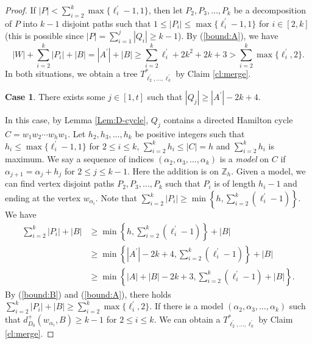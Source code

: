 \documentclass[11pt,a4paper]{article}
\theoremstyle{definition}
\newtheorem{case}{Case}
\begin{document}
\begin{proof}
If $|P|<\sum_{i=2}^k \max\{\ell^\prime_i-1,1\}$, then let $P_2,P_3,\ldots,P_k$ be a decomposition of $P$ into $k-1$ disjoint paths such that $1\leq |P_i|\leq \max\{\ell^\prime_i-1,1\}$ for $i\in [2,k]$ (this is possible since $|P|=\sum_{i=1}^j |Q_i|\geq k-1$).
By (\ref{bound:A}), we have
$$|W|+\sum_{i=2}^k|P_i|+|B|=|A^\prime|+|B|\geq \sum_{i=2}^k \ell^\prime_i+2k^2+2k+3>\sum_{i=2}^k \max\{\ell^\prime_i,2\}.$$
In both situations, we obtain a tree $T^*_{ \ell^\prime_2, \ldots, \ell^\prime_k}$ by Claim \ref{cl:merge}.


\begin{case}
There exists some $j\in[1,t]$ such that $|Q_j|\geq |A^\prime|-2k+4$.
\end{case}
In this case, by Lemma \ref{Lem:D-cycle}, $Q_j$ contains a directed Hamilton cycle $C=w_1w_2\cdots w_hw_1$.
Let $h_2,h_3,\ldots,h_k$ be positive integers such that $h_i\leq \max\{\ell^\prime_i-1,1\}$ for $2\leq i\leq k$, $\sum_{i=2}^k h_i\leq |C|=h$  and $\sum_{i=2}^k h_i$ is maximum.
We say a sequence of indices $(\alpha_2,\alpha_3,\ldots,\alpha_k)$ is a {\it model} on $C$ if $\alpha_{j+1}=\alpha_{j}+h_{j}$ for $2\leq j\leq k-1$. Here the addition is on $\mathbb{Z}_h$. Given a model, we can find vertex disjoint paths $P_2,P_3,\ldots,P_k$ such that $P_i$ is of length $h_i-1$ and ending at the vertex $w_{\alpha_i}$.
Note that $\sum_{i=2}^k|P_i|\geq \min\left\{h, \sum_{i=2}^k(\ell^\prime_i-1)\right\}$. We have
\begin{align*}
\sum_{i=2}^k|P_i|+|B|&\geq \min\left\{h, \sum_{i=2}^k(\ell^\prime_i-1)\right\}+|B|\\
&\geq \min\left\{|A^\prime|-2k+4,\sum_{i=2}^k(\ell^\prime_i-1)\right\}+|B|\\
&\geq \min\left\{|A|+|B|-2k+3,\sum_{i=2}^k(\ell^\prime_i-1)+|B|\right\}.
\end{align*}
By (\ref{bound:B}) and (\ref{bound:A}), there holds
$\sum_{i=2}^k|P_i|+|B|\geq \sum_{i=2}^k \max\{\ell^\prime_i,2\}$.
If there is a model $(\alpha_2,\alpha_3,\ldots,\alpha_k)$ such that $d^+_{D_0}(w_{\alpha_i},B)\geq k-1$ for $2\leq i\leq k$. We can obtain a $T^*_{ \ell^\prime_2, \ldots, \ell^\prime_k}$ by Claim \ref{cl:merge}.


\end{proof}
\end{document}
